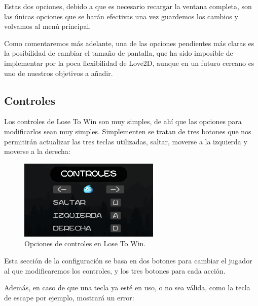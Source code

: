 \documentclass[12pt, spanish]{article}
\begin{document}
Estas dos opciones, debido a que es necesario recargar la ventana completa, son las únicas opciones que se harán efectivas una vez guardemos los cambios y volvamos al menú principal.

Como comentaremos más adelante, una de las opciones pendientes más claras es la posibilidad de cambiar el tamaño de pantalla, que ha sido imposible de implementar por la poca flexibilidad de Love2D, aunque en un futuro cercano es uno de nuestros objetivos a añadir.

\subsection{Controles}

Los controles de Lose To Win son muy simples, de ahí que las opciones para modificarlos sean muy simples. Simplementen se tratan de tres botones que nos permitirán actualizar las tres teclas utilizadas, saltar, moverse a la izquierda y moverse a la derecha:

\begin{figure}[H]
	\centering
	\includegraphics[width=0.6\textwidth]{"opciones/controles_especifico.png"}
	\caption{Opciones de controles en Lose To Win.}\label{figure:controles_especifico}
\end{figure}

Esta sección de la configuración se basa en dos botones para cambiar el jugador al que modificaremos los controles, y los tres botones para cada acción.

Además, en caso de que una tecla ya esté en uso, o no sea válida, como la tecla de escape por ejemplo, mostrará un error:
\end{document}
